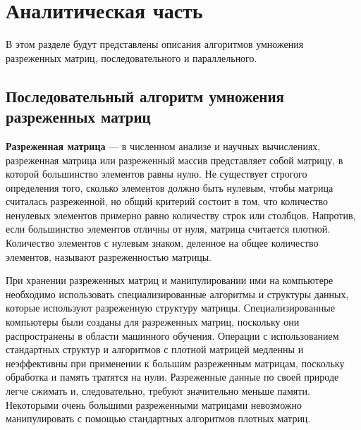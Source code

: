 \chapter{Аналитическая часть}
В этом разделе будут представлены описания алгоритмов умножения разреженных матриц, последовательного и параллельного.

\section{Последовательный алгоритм умножения разреженных матриц}

\textbf{Разреженная матрица} \cite{piss} — в численном анализе и научных вычислениях, разреженная матрица или разреженный массив представляет собой матрицу, в которой большинство элементов равны нулю. Не существует строгого определения того, сколько элементов должно быть нулевым, чтобы матрица считалась разреженной, но общий критерий состоит в том, что количество ненулевых элементов примерно равно количеству строк или столбцов. Напротив, если большинство элементов отличны от нуля, матрица считается плотной. Количество элементов с нулевым знаком, деленное на общее количество элементов, называют разреженностью матрицы.

При хранении разреженных матриц и манипулировании ими на компьютере необходимо использовать специализированные алгоритмы и структуры данных, которые используют разреженную структуру матрицы. Специализированные компьютеры были созданы для разреженных матриц, поскольку они распространены в области машинного обучения. Операции с использованием стандартных структур и алгоритмов с плотной матрицей медленны и неэффективны при применении к большим разреженным матрицам, поскольку обработка и память тратятся на нули. Разреженные данные по своей природе легче сжимать и, следовательно, требуют значительно меньше памяти. Некоторыми очень большими разреженными матрицами невозможно манипулировать с помощью стандартных алгоритмов плотных матриц.

